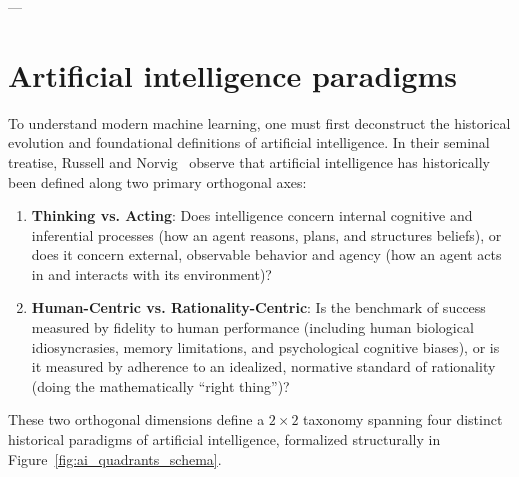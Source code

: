 ---

\section{Artificial intelligence paradigms}
\label{sec:what_is_ai}

To understand modern machine learning, one must first deconstruct the historical evolution and foundational definitions of artificial intelligence. In their seminal treatise, Russell and Norvig~\cite{russell2020artificial} observe that artificial intelligence has historically been defined along two primary orthogonal axes:
\begin{enumerate}
  \item \textbf{Thinking vs. Acting}: Does intelligence concern internal cognitive and inferential processes (how an agent reasons, plans, and structures beliefs), or does it concern external, observable behavior and agency (how an agent acts in and interacts with its environment)?
  \item \textbf{Human-Centric vs. Rationality-Centric}: Is the benchmark of success measured by fidelity to human performance (including human biological idiosyncrasies, memory limitations, and psychological cognitive biases), or is it measured by adherence to an idealized, normative standard of rationality (doing the mathematically ``right thing'')?
\end{enumerate}

These two orthogonal dimensions define a $2 \times 2$ taxonomy spanning four distinct historical paradigms of artificial intelligence, formalized structurally in Figure~\ref{fig:ai_quadrants_schema}.

